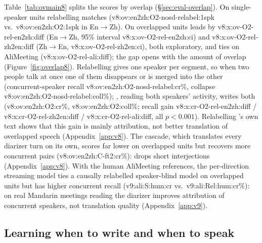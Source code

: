 Table~\ref{tab:ovmain8} splits the scores by overlap (\S\ref{sec:eval-overlap}). On single-speaker units relabelling
matches \sys{} (\num{v8:ov:en2zh:O2-nosd-relabel:1spk} vs.\ \num{v8:ov:en2zh:O2:1spk} in En$\rightarrow$Zh). On
overlapped units \sys{} leads by \num{v8:x:ov-O2-rel-en2zh:diff} (En$\rightarrow$Zh, 95\% interval
\num{v8:x:ov-O2-rel-en2zh:ci}) and \num{v8:x:ov-O2-rel-zh2en:diff} (Zh$\rightarrow$En, \num{v8:x:ov-O2-rel-zh2en:ci}),
both exploratory, and ties on AliMeeting (\num{v8:x:ov-O2-rel-ali:diff}); the gap opens with the amount of overlap
(Figure~\ref{fig:overlap8}). Relabelling gives one speaker per segment, so when two people talk at once one of them
disappears or is merged into the other (concurrent-speaker recall \num{v8:ov:en2zh:O2-nosd-relabel:cr}\%, collapse
\num{v8:ov:en2zh:O2-nosd-relabel:coll}\%); \sys{}, reading both speakers' activity, writes both (\num{v8:ov:en2zh:O2:cr}\%,
\num{v8:ov:en2zh:O2:coll}\%; recall gain \num{v8:x:cr-O2-rel-en2zh:diff} / \num{v8:x:cr-O2-rel-zh2en:diff} /
\num{v8:x:cr-O2-rel-ali:diff}, all $p<0.001$). Relabelling \sys{}'s own text shows that this gain is mainly
attribution, not better translation of overlapped speech (Appendix~\ref{app:v8}). The cascade, which translates every diarizer turn on its own, scores far
lower on overlapped units but recovers more concurrent pairs (\num{v8:ov:en2zh:C-ft2:cr}\%): \sys{} drops short
interjections (Appendix~\ref{app:v8}). With the human AliMeeting references, the per-direction streaming model ties a causally
relabelled speaker-blind model on overlapped units but has higher concurrent recall (\num{v9:ali:S:hum:cr} vs.\
\num{v9:ali:Rel:hum:cr}\%): on real Mandarin meetings reading the diarizer improves attribution of concurrent speakers,
not translation quality (Appendix~\ref{app:v9}).
\label{sec:res-real}
\label{sec:res-speech}

\subsection{Learning when to write and when to speak}
\label{sec:res-v10}



